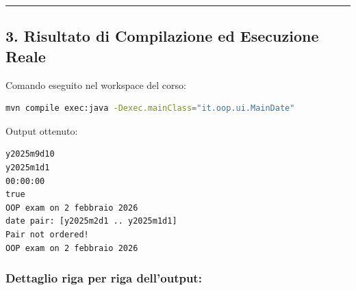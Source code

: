 \documentclass[11pt,a4paper]{article}
\begin{document}
\begin{center}\rule{0.5\linewidth}{0.5pt}\end{center}

\subsection{3. Risultato di Compilazione ed Esecuzione
Reale}\label{risultato-di-compilazione-ed-esecuzione-reale}

Comando eseguito nel workspace del corso:

\begin{lstlisting}[language=bash]
mvn compile exec:java -Dexec.mainClass="it.oop.ui.MainDate"
\end{lstlisting}

Output ottenuto:

\begin{lstlisting}
y2025m9d10
y2025m1d1
00:00:00
true
OOP exam on 2 febbraio 2026
date pair: [y2025m2d1 .. y2025m1d1]
Pair not ordered!
OOP exam on 2 febbraio 2026
\end{lstlisting}

\subsubsection{Dettaglio riga per riga
dell'output:}\label{dettaglio-riga-per-riga-delloutput}
\end{document}
